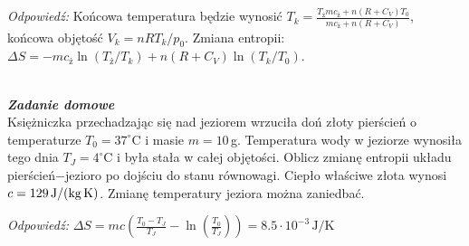 \documentclass[11pt,a4paper]{article}
\newcounter{zaddom}\newcommand{\zaddom}[1][]{\addtocounter{zaddom}{1} ~\\  {\bf \emph{Zadanie domowe \arabic{zaddom} #1 }} \\}
\renewcommand{\t}[1]{\textrm{#1}}
\begin{document}
\noindent
\emph{Odpowiedź:} Końcowa temperatura będzie wynosić $T_k = \frac{T_{\t{ż}} m  c_{\t{ż}} + n (R + C_V)T_0}{m c_{\t{ż}}+ n(R + C_V)}$,
końcowa objętość $V_k = n R T_k/p_0$. Zmiana entropii: $\Delta S=-m c_{\t{ż}} \ln(T_{\t{ż}}/T_k) + n(R + C_V) \ln(T_k/T_0)$.



\zaddom
Księżniczka przechadzając się nad jeziorem wrzuciła doń złoty pierścień o temperaturze $T_0 = 37^\circ$C
i masie $m = 10\,$g. Temperatura wody w jeziorze wynosiła tego dnia $T_J = 4^\circ$C i była stała
w całej objętości. Oblicz zmianę entropii układu pierścień$-$jezioro po dojściu do stanu
równowagi. Ciepło właściwe złota wynosi $c=129\,{\rm J/(kg\, K)}$. Zmianę temperatury jeziora
można zaniedbać.
\newline

\noindent
\emph{Odpowiedź:}
$\Delta S = mc \left( \frac{T_0 - T_J}{T_J}  - \ln\left(\frac{T_0}{T_J}\right)  \right) = 8.5 \cdot 10^{-3}\, \t{J/K}$
\end{document}
